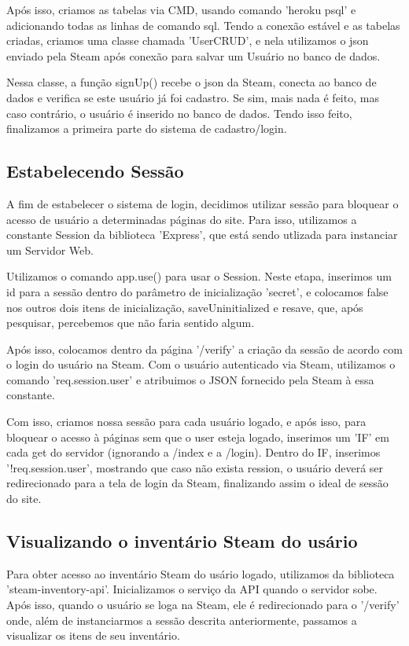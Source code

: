     Após isso, criamos as tabelas via CMD, usando comando 'heroku psql' e adicionando todas as linhas de comando sql.
    Tendo a conexão estável e as tabelas criadas, criamos uma classe chamada 'UserCRUD', e nela utilizamos o json 
    enviado pela Steam após conexão para salvar um Usuário no banco de dados.

    Nessa classe, a função signUp() recebe o json da Steam, conecta ao banco de dados e verifica se este usuário 
    já foi cadastro. Se sim, mais nada é feito, mas caso contrário, o usuário é inserido no banco de dados.
    Tendo isso feito, finalizamos a primeira parte do sistema de cadastro/login.

    \subsection{Estabelecendo Sessão}
    A fim de estabelecer o sistema de login, decidimos utilizar sessão para bloquear o acesso de usuário a 
    determinadas páginas do site. Para isso, utilizamos a constante Session da biblioteca 'Express', que está 
    sendo utlizada para instanciar um Servidor Web.

    Utilizamos o comando app.use() para usar o Session. Neste etapa, inserimos um id para a sessão dentro do 
    parâmetro de inicialização 'secret', e colocamos false nos outros dois itens de inicialização, saveUninitialized e resave, que, 
    após pesquisar, percebemos que não faria sentido algum.

    Após isso, colocamos dentro da página '/verify' a criação da sessão de acordo com o login do usuário na Steam. 
    Com o usuário autenticado via Steam, utilizamos o comando 'req.session.user' e atribuimos o JSON fornecido pela Steam 
    à essa constante.

    Com isso, criamos nossa sessão para cada usuário logado, e após isso, para bloquear o acesso à páginas sem que o user 
    esteja logado, inserimos um 'IF' em cada get do servidor (ignorando a /index e a /login). Dentro do IF, 
    inserimos '!req.session.user', mostrando que caso não exista ression, o usuário deverá ser redirecionado para a 
    tela de login da Steam, finalizando assim o ideal de sessão do site. 

    \subsection{Visualizando o inventário Steam do usário}
    Para obter acesso ao inventário Steam do usário logado, utilizamos da biblioteca 'steam-inventory-api'. 
    Inicializamos o serviço da API quando o servidor sobe. Após isso, quando o usuário se loga na Steam, ele é redirecionado para o '/verify' onde, 
    além de instanciarmos a sessão descrita anteriormente, passamos a visualizar os itens de seu inventário.
    
